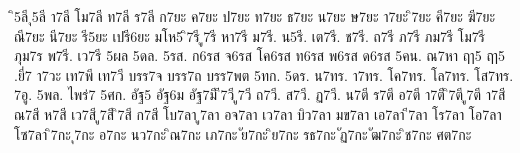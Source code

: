 {ิ5ลี
ุ5ลี
า7ลี
โม7ลี
ท7ลี
ร7ลี
ก7ยะ
ค7ยะ
ป7ยะ
ท7ยะ
ธ7ยะ
น7ยะ
ษ7ยะ
า7ยะ
ิ7ยะ
คี7ยะ
ฆี7ยะ
ณี7ยะ
นี7ยะ
รี5ยะ
เปรี6ยะ
มโห5
ิ7รี
ู7รี
หา7รี
ม7รี.
น5รี.
เต7รี.
ช7รี.
ถ7รี
ภ7รี
ภม7รี
โม7รี
ภุม7ร
พ7รี.
เว7รี
5ผล
5ดล.
5รส.
ก6รส
จ6รส
โค6รส
ท6รส
พ6รส
ด6รส
5คน.
ณ7หา
ฤๅ5
ฤา5
.ยี่7
า7วะ
เท7พี
เท7วี
บรร7จ
บรร7ถ
บรร7พต
5ทก.
5ดร.
น7ทร.
า7ทร.
โค7ทร.
โล7ทร.
โส7ทร.
7อู.
5พล.
ไพร่7
5ศก.
อัฐ5
อัฐ6ม
อัฐ7มี
ี7วี
ู7วี
ถ7วี.
ส7วี.
ฏ7วี.
น7ตี
ร7ตี
อ7ตี
า7ตี
ิ7ตี
ู7ตี
า7สี
ณ7สี
ห7สี
เว7สี
ู7สี
ิ7สี
ก7สี
โบ7ลา
ู7ลา
อจ7ลา
เว7ลา
บิว7ลา
มข7ลา
เอ7ลา
ี7ลา
โร7ลา
โอ7ลา
โซ7ลา
ิ7กะ
ุ7กะ
อ7กะ
นว7กะ
ิณ7กะ
เภ7กะ
ัย7กะ
ิย7กะ
รธ7กะ
ัฏ7กะ
ัฒ7กะ
ิช7กะ
ศต7กะ
}
